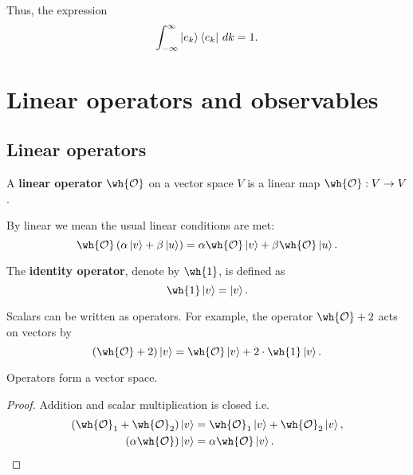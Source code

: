 \documentclass[12pt, a4paper]{article}
\begin{document}
\begin{mdremark}
    Thus, the expression 
    \[\int_{-\infty}^{\infty} \ket{e_k} \bra{e_k} \, dk =1.\]
\end{mdremark}

\section{Linear operators and observables}

\subsection{Linear operators}

\begin{definition}
    A \textbf{linear operator} \(\wh{\mathcal{O}}\) on a vector space \(V\) is a linear map \(\wh{\mathcal{O}} : V \to V\). 
\end{definition}

\begin{mdnote}
    By linear we mean the usual linear conditions are met:
    \[\wh{\mathcal{O}} \left( \alpha\ket{v} +\beta\ket{u} \right) = \alpha \wh{\mathcal{O}}\ket{v}+\beta\wh{\mathcal{O}}\ket{u}.\]
\end{mdnote} 

\begin{definition}
    The \textbf{identity operator}, denote by \(\wh{1}\), is defined as 
    \[\wh{1} \ket{v} = \ket{v}.\]
\end{definition}

\begin{corollary}
    Scalars can be written as operators. For example, the operator \(\wh{\mathcal{O}}+2\) acts on vectors by 
    \[\left( \wh{\mathcal{O}}+2 \right) \ket{v} = \wh{\mathcal{O}} \ket{v} + 2 \cdot \wh{1} \ket{v}.\]
\end{corollary}

\begin{theorem}
    Operators form a vector space.
\end{theorem}

\begin{proof}
    Addition and scalar multiplication is closed i.e.
    \[\begin{aligned}
        \left( \wh{\mathcal{O}}_1+\wh{\mathcal{O}}_2 \right) \ket{v} &= \wh{\mathcal{O}}_1\ket{v} +\wh{\mathcal{O}}_2 \ket{v}, \\
        \left( \alpha \wh{\mathcal{O}} \right) \ket{v} &= \alpha \wh{\mathcal{O}} \ket{v}.
    \end{aligned}\]
\end{proof}
\end{document}
